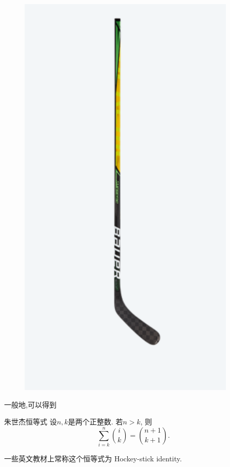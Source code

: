 \documentclass[punct]{ctexbeamer}
\begin{document}
\begin{frame}
\begin{minipage}{0.3\linewidth}
\begin{figure}
            \includegraphics[scale=0.3]{HockeyStick.png}
        \end{figure}
    \end{minipage}

    一般地,可以得到
    \begin{block}{朱世杰恒等式}
        设$n,k$是两个正整数.
        若$n>k$, 则
        $$\sum_{i=k}^{n}\binom{i}{k}=\binom{n+1}{k+1}.$$
    \end{block}

    一些英文教材上常称这个恒等式为 Hockey-stick identity.


\end{frame}
\end{document}
